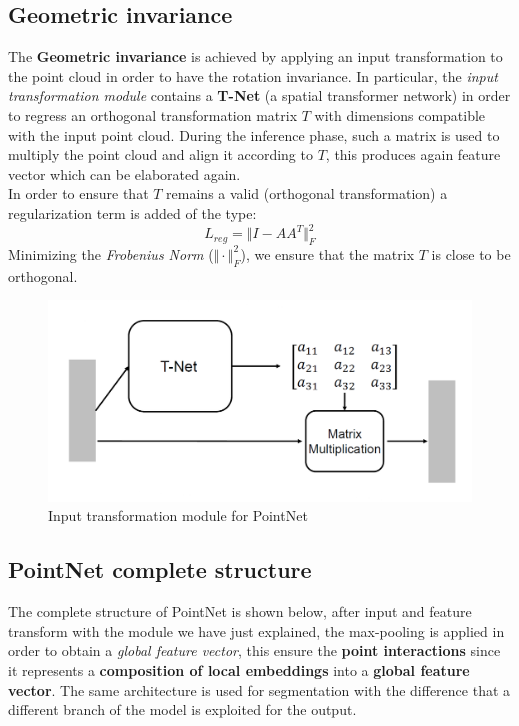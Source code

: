 \subsection{Geometric invariance} 
The \textbf{Geometric invariance} is achieved by applying an input transformation to the point cloud in order to have the rotation invariance. In particular, the \textit{input transformation module} contains a \textbf{T-Net} (a spatial transformer network) in order to regress an orthogonal transformation matrix $T$ with dimensions compatible with the input point cloud. During the inference phase, such a matrix is used to multiply the point cloud and align it according to $T$, this produces again feature vector which can be elaborated again.\\
In order to ensure that $T$ remains a valid (orthogonal transformation) a regularization term is added of the type: 
\begin{equation*}
    L_{reg}=\Vert I-AA^T \Vert_F^2
\end{equation*}
Minimizing the \textit{Frobenius Norm} ($\Vert\cdot\Vert_F^2$), we ensure that the matrix $T$ is close to be orthogonal.

\begin{figure}[h]
    \centering
    \includegraphics[scale=0.5]{img/PointNet_InputTrans.png}
    \caption{Input transformation module for PointNet}
\end{figure}

\subsection{PointNet complete structure}
The complete structure of PointNet is shown below, after input and feature transform with the module we have just explained, the max-pooling is applied in order to obtain a  \textit{global feature vector}, this ensure the \textbf{point interactions} since it represents a \textbf{composition of local embeddings} into a \textbf{global feature vector}. The same architecture is used for segmentation with the difference that a different branch of the model is exploited for the output.

